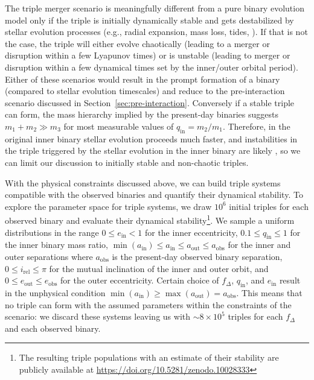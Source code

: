\documentclass{aa}
\DeclareRobustCommand{\Secref}[1]{Section~\ref{#1}}
\begin{document}
The triple merger scenario is meaningfully different from a pure
binary evolution model only if the triple is initially dynamically stable and gets
destabilized by stellar evolution processes (e.g., radial expansion,
mass loss, tides, \citealt{perets:12}). If that is not the case, the
triple will either evolve chaotically (leading to a merger or
disruption within a few Lyapunov times) or is unstable (leading to
merger or disruption within a few dynamical times set by the inner/outer
orbital period). Either of these scenarios would result in the prompt
formation of a binary (compared to stellar evolution timescales) and
reduce to the pre-interaction scenario discussed in
\Secref{sec:pre-interaction}. Conversely if a stable triple can form,
the mass hierarchy implied by the present-day binaries suggests
$m_1+m_2 \gg m_3$ for most measurable values of
$q_\mathrm{in}=m_2/m_1$. Therefore, in the original inner binary
stellar evolution proceeds much faster, and instabilities in the
triple triggered by the stellar evolution in the inner binary are
likely \citep{perets:12}, so we can limit our discussion to initially
 stable and non-chaotic triples.

 With the physical constraints discussed above, we can build triple
 systems compatible with the observed binaries and
 quantify their dynamical stability. To explore the
 parameter space for triple systems, we draw $10^6$ initial triples for each
 observed binary and
 evaluate their dynamical stability\footnote{The resulting triple
   populations with an estimate of their stability are
 publicly available at \url{https://doi.org/10.5281/zenodo.10028333}}.
 We sample a uniform distributions in the range $0\leq e_\mathrm{in}<1$ for the
 inner eccentricity, $0.1\leq q_\mathrm{in}\leq 1$ for the inner
 binary mass ratio,
 $\min(a_\mathrm{in})\leq a_\mathrm{in}\leq a_\mathrm{out}\leq a_\mathrm{obs}$
 for the inner and outer separations where $a_\mathrm{obs}$ is the
 present-day observed binary separation,
 $0\leq i_\mathrm{rel}\leq \pi$ for the mutual inclination of the
 inner and outer orbit, and $0\leq e_\mathrm{out}\leq e_\mathrm{obs}$
 for the outer eccentricity. Certain choice of $f_\Delta$,
 $q_\mathrm{in}$, and $e_\mathrm{in}$ result in the unphysical
 condition
 $\min(a_\mathrm{in}) \geq \max(a_\mathrm{out})=a_\mathrm{obs}$. This
 means that no triple can form with the assumed parameters within the
 constraints of the scenario: we discard these systems leaving us with
 $\sim 8\times 10^5$ triples for each $f_\Delta$ and each observed
 binary.
\end{document}
